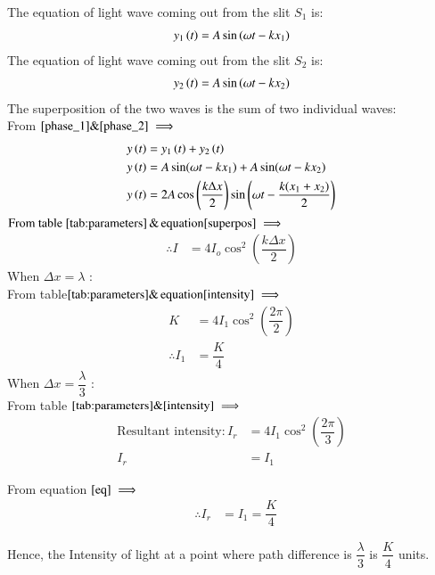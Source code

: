 \documentclass[journal,12pt,twocolumn]{IEEEtran}
\theoremstyle{remark}
\begin{document}
The equation of light wave coming out from the slit $S_1$ is:
\begin{align}
    y_1\left(t\right) = A\sin{(\omega t - kx_1)} \label{phase_1}
\end{align}
The equation of light wave coming out from the slit $S_2$ is:
\begin{align}
     y_2\left(t\right) = A\sin{(\omega t - kx_2)} \label{phase_2}
\end{align}
The superposition of the two waves is the sum of two individual waves: \\
From $\eqref{phase_1} \& \eqref{phase_2} \implies$
\begin{align}
y\left(t\right) &= y_1\left(t\right) + y_2\left(t\right)  \\
y\left(t\right) &= A\sin({\omega t - kx_1})  + A\sin({ \omega t - kx_2}) \nonumber \\
y\left(t\right) &=  2A\cos\left(\dfrac{k\Delta x}{2}\right)\sin\left(\omega t - \dfrac{k(x_1+x_2)}{2} \right) \label{superpos}
\end{align}
$\text{From table }\eqref{tab:parameters}\, \& \,\text{equation}\eqref{superpos} \implies $ 
\begin{align}
\therefore I &= 4I_o\cos^2\left(\dfrac{k\Delta x}{2}\right)  \label{intensity}
\end{align}
When $\Delta x = \lambda$ : \\
From table$ \eqref{tab:parameters} \& \,\text{equation}\eqref{intensity} \implies$ 
\begin{align}
  K &= 4I_1\cos^2\left(\dfrac{2\pi}{2}\right)  \\
 \therefore I_1&=\dfrac{K}{4} \label{eq}
\end{align}
When $\Delta x = \dfrac{\lambda}{3}$ : \\
From table $\eqref{tab:parameters} \& \eqref{intensity} \implies$ 
\begin{align}
\text{Resultant intensity}:I_r &= 4I_1\cos^2\left(\dfrac{2\pi}{3}\right) \\
I_r &= I_1
\end{align}

From equation $ \eqref{eq} \implies$
\hspace*{0.5cm}
\begin{align}
 \,\,\,\, \therefore I_r &= I_1 =\dfrac{K}{4} 
\end{align}

Hence, the Intensity of light at a point where path difference is $\dfrac{\lambda}{3}$ is $\dfrac{K}{4}$ units.


\end{document}
